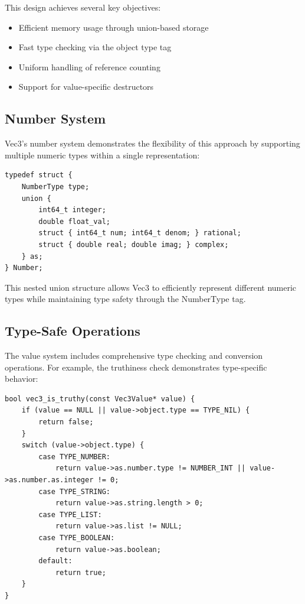 This design achieves several key objectives:

\begin{itemize}[nolistsep]
    \item Efficient memory usage through union-based storage
    \item Fast type checking via the object type tag
    \item Uniform handling of reference counting
    \item Support for value-specific destructors
\end{itemize}

\subsection{Number System}\label{subsec:number-system}

Vec3's number system demonstrates the flexibility of this approach by supporting multiple numeric types within a single representation:

\begin{verbatim}
typedef struct {
    NumberType type;
    union {
        int64_t integer;
        double float_val;
        struct { int64_t num; int64_t denom; } rational;
        struct { double real; double imag; } complex;
    } as;
} Number;
\end{verbatim}

This nested union structure allows Vec3 to efficiently represent different numeric types while maintaining type safety through the NumberType tag.

\subsection{Type-Safe Operations}\label{subsec:type-safe-operations}

The value system includes comprehensive type checking and conversion operations.
For example, the truthiness check demonstrates type-specific behavior:

\begin{verbatim}
bool vec3_is_truthy(const Vec3Value* value) {
    if (value == NULL || value->object.type == TYPE_NIL) {
        return false;
    }
    switch (value->object.type) {
        case TYPE_NUMBER:
            return value->as.number.type != NUMBER_INT || value->as.number.as.integer != 0;
        case TYPE_STRING:
            return value->as.string.length > 0;
        case TYPE_LIST:
            return value->as.list != NULL;
        case TYPE_BOOLEAN:
            return value->as.boolean;
        default:
            return true;
    }
}
\end{verbatim}


